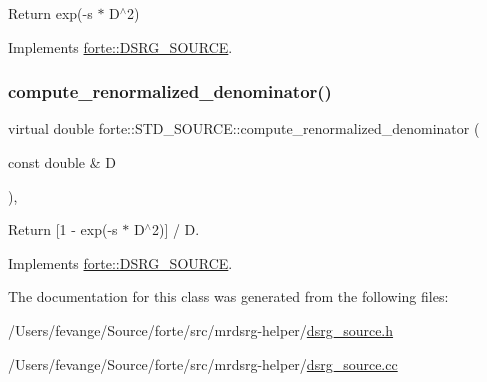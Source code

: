 Return exp(-\/s $\ast$ D$^\wedge$2) 



Implements \mbox{\hyperlink{classforte_1_1_d_s_r_g___s_o_u_r_c_e_a8b4c4428bb50af4561c256e3180f6b31}{forte\+::\+D\+S\+R\+G\+\_\+\+S\+O\+U\+R\+CE}}.

\mbox{\label{classforte_1_1_s_t_d___s_o_u_r_c_e_a3f9dda1563d4679949001e604324eb16}} 
\subsubsection{\texorpdfstring{compute\+\_\+renormalized\+\_\+denominator()}{compute\_renormalized\_denominator()}}
{\footnotesize\ttfamily virtual double forte\+::\+S\+T\+D\+\_\+\+S\+O\+U\+R\+C\+E\+::compute\+\_\+renormalized\+\_\+denominator (\begin{DoxyParamCaption}\item[{const double \&}]{D }\end{DoxyParamCaption})\hspace{0.3cm}{\ttfamily [inline]}, {\ttfamily [virtual]}}



Return \mbox{[}1 -\/ exp(-\/s $\ast$ D$^\wedge$2)\mbox{]} / D. 



Implements \mbox{\hyperlink{classforte_1_1_d_s_r_g___s_o_u_r_c_e_a7345ba63c3612369be7c4cc896b7d5c4}{forte\+::\+D\+S\+R\+G\+\_\+\+S\+O\+U\+R\+CE}}.



The documentation for this class was generated from the following files\+:\begin{DoxyCompactItemize}
\item 
/\+Users/fevange/\+Source/forte/src/mrdsrg-\/helper/\mbox{\hyperlink{dsrg__source_8h}{dsrg\+\_\+source.\+h}}\item 
/\+Users/fevange/\+Source/forte/src/mrdsrg-\/helper/\mbox{\hyperlink{dsrg__source_8cc}{dsrg\+\_\+source.\+cc}}\end{DoxyCompactItemize}
